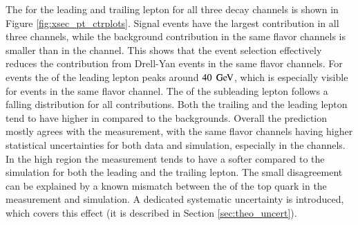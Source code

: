 The \pt for the leading and trailing lepton for all three decay channels is shown in Figure \ref{fig:xsec_pt_ctrplots}.
Signal events have the largest contribution in all three channels, while the background contribution in the same flavor channels is smaller than in the \emu channel. This shows that the event selection effectively reduces the contribution from Drell-Yan events in the same flavor channels.
For \ttbar events the \pt of the leading lepton peaks around $40\; \,\text{Ge\hspace{-.08em}V}$, which is especially visible for events in the same flavor channel. The \pt of the subleading lepton follows a falling distribution for all contributions. 
Both the trailing and the leading lepton tend to have higher \pt in \ttbar compared to the backgrounds.
Overall the prediction mostly agrees with the measurement, with the same flavor channels having higher statistical uncertainties for both data and simulation, especially in the \ee channels.
In the high \pt region the measurement tends to have a softer \pt compared to the simulation for both the leading and the trailing lepton.
The small disagreement can be explained by a known mismatch between the \pt of the top quark in the measurement and simulation. A dedicated systematic uncertainty is introduced, which covers this effect (it is described in Section \ref{sec:theo_uncert}).


